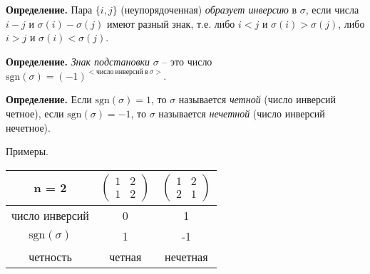 \bigskip
\textbf{Определение.} Пара $\{i, j\}$ (неупорядоченная) \textit{образует инверсию} в $\sigma$, если числа $i-j$ и $\sigma (i) - \sigma (j)$ имеют разный знак, т.е. либо $i < j$ и $\sigma (i) > \sigma (j)$, либо $i > j$ и $\sigma (i) < \sigma (j)$.

\bigskip
\textbf{Определение.} \textit{Знак подстановки} $\sigma$ -- это  число $\mathrm{sgn} (\sigma) = (-1) ^{<число \ инверсий \ в \ \sigma>}$.

\bigskip
\textbf{Определение.} Если $\mathrm{sgn}(\sigma) = 1$, то $\sigma$ называется \textit{четной} (число инверсий четное), если $\mathrm{sgn}(\sigma) = -1$, то $\sigma$ называется \textit{нечетной} (число инверсий нечетное).

\bigskip
Примеры.

\begin{table}[!ht]
		\begin{tabular}{c|c|c}
    	n = 2 & $\begin{pmatrix} 1 & 2 \\ 1 & 2 \end{pmatrix}$ & $\begin{pmatrix} 1 & 2 \\ 2 & 1 \end{pmatrix}$ \\
        \hline
       число инверсий & 0 & 1 \\
       \hline
          $\mathrm{sgn} (\sigma)$ & 1 & -1 \\
          \hline
        четность & четная & нечетная
		\end{tabular}
\end{table}

